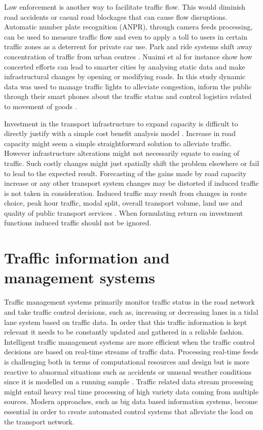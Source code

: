 \documentclass[12pt, a4paper]{report}
\theoremstyle{definition}
\theoremstyle{definition}%
\theoremstyle{definition}%
\theoremstyle{definition}%
\theoremstyle{definition}%
\theoremstyle{definition}%
\begin{document}
Law enforcement is another way to facilitate traffic flow. This would diminish road accidents or casual road blockages that can cause flow disruptions. Automatic number plate recognition (ANPR), through camera feeds processing, can be used to measure traffic flow and even to apply a toll to users in certain traffic zones as a deterrent for private car use.  Park and ride systems shift away concentration of traffic from urban centres \cite{Attard2015}.  Nuaimi et al for instance show how concerted efforts can lead to smarter cities by analysing static data and make infrastructural changes by opening or modifying roads. In this study dynamic data was used to manage traffic lights to alleviate congestion, inform the public through their smart phones about the traffic status and control logistics related to movement of goods \cite{AlNuaimi2015}.

Investment in the transport infrastructure to expand capacity is difficult to directly justify with a simple cost benefit analysis model \cite{atkinson2006cost}. Increase in road capacity might seem a simple straightforward solution to alleviate traffic.  However infrastructure alterations might not necessarily equate to easing of traffic. Such costly changes might just spatially shift the problem elsewhere or fail to lead to the expected result. Forecasting of the gains made by road capacity increase or any other transport system changes may be distorted if induced traffic is not taken in consideration. Induced traffic may result from changes in route choice, peak hour traffic, modal split, overall transport volume, land use and quality of public transport services \cite{Naess2012}. When formulating return on investment functions induced traffic should not be ignored.


\section{Traffic information and management systems}\label{section:introduction:traffic_information_and_management_systems}

Traffic management systems primarily monitor traffic status in the road network and take traffic control decisions, such as, increasing or decreasing lanes in a tidal lane system based on traffic data. In order that this traffic information is kept relevant it needs to be constantly updated and gathered in a reliable fashion. Intelligent traffic management systems are more efficient when the traffic control decisions are based on real-time streams of traffic data. Processing real-time feeds is challenging both in terms of computational resources and design but is more reactive to abnormal situations such as accidents or unusual weather conditions since it is modelled on a running sample \cite{Toole2015}. Traffic related data stream processing might entail heavy real time processing of high variety data coming from multiple sources. Modern approaches, such as big data based information systems, become essential in order to create automated control systems that alleviate the load on the transport network\cite{Liu2014}.
\end{document}

